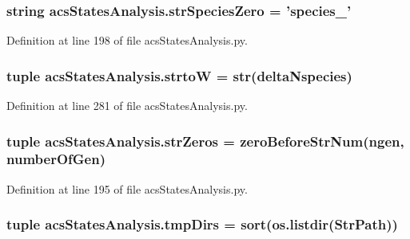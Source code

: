\hypertarget{a00098_a52f7239b2be2cb978182547960b6c46e}{
\subsubsection[{str\-Species\-Zero}]{\setlength{\rightskip}{0pt plus 5cm}string acs\-States\-Analysis.\-str\-Species\-Zero = 'species\-\_\-'}}\label{a00098_a52f7239b2be2cb978182547960b6c46e}


Definition at line 198 of file acs\-States\-Analysis.\-py.

\hypertarget{a00098_abe05028c33fab522e3b940195eaaa586}{
\subsubsection[{strto\-W}]{\setlength{\rightskip}{0pt plus 5cm}tuple acs\-States\-Analysis.\-strto\-W = str({\bf delta\-Nspecies})}}\label{a00098_abe05028c33fab522e3b940195eaaa586}


Definition at line 281 of file acs\-States\-Analysis.\-py.

\hypertarget{a00098_a292c23aa303304f24632662a5dfbfa23}{
\subsubsection[{str\-Zeros}]{\setlength{\rightskip}{0pt plus 5cm}tuple acs\-States\-Analysis.\-str\-Zeros = {\bf zero\-Before\-Str\-Num}(ngen, {\bf number\-Of\-Gen})}}\label{a00098_a292c23aa303304f24632662a5dfbfa23}


Definition at line 195 of file acs\-States\-Analysis.\-py.

\hypertarget{a00098_ab71c19ee20acae0f07934a8d0e9fe50b}{
\subsubsection[{tmp\-Dirs}]{\setlength{\rightskip}{0pt plus 5cm}tuple acs\-States\-Analysis.\-tmp\-Dirs = sort(os.\-listdir({\bf Str\-Path}))}}\label{a00098_ab71c19ee20acae0f07934a8d0e9fe50b}


